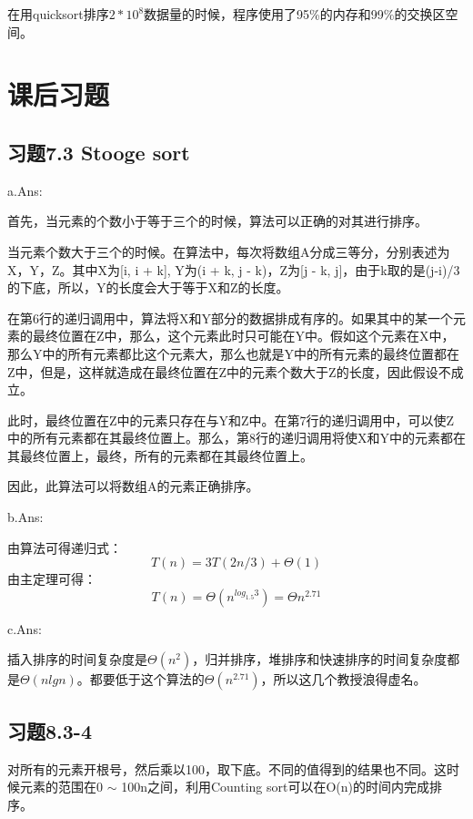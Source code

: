 \documentclass[a4paper, 11pt]{article}
\begin{document}
在用quicksort排序$2 * 10 ^ 8$数据量的时候，程序使用了95\%的内存和99\%的交换区空间。

\section{课后习题}
\subsection{习题7.3 Stooge sort}
a.Ans:

首先，当元素的个数小于等于三个的时候，算法可以正确的对其进行排序。

当元素个数大于三个的时候。在算法中，每次将数组A分成三等分，分别表述为X，Y，Z。其中X为[i, i + k], Y为(i + k, j - k)，Z为[j - k, j]，由于k取的是(j-i)/3的下底，所以，Y的长度会大于等于X和Z的长度。

在第6行的递归调用中，算法将X和Y部分的数据排成有序的。如果其中的某一个元素的最终位置在Z中，那么，这个元素此时只可能在Y中。假如这个元素在X中，那么Y中的所有元素都比这个元素大，那么也就是Y中的所有元素的最终位置都在Z中，但是，这样就造成在最终位置在Z中的元素个数大于Z的长度，因此假设不成立。

此时，最终位置在Z中的元素只存在与Y和Z中。在第7行的递归调用中，可以使Z中的所有元素都在其最终位置上。那么，第8行的递归调用将使X和Y中的元素都在其最终位置上，最终，所有的元素都在其最终位置上。

因此，此算法可以将数组A的元素正确排序。

b.Ans:

由算法可得递归式：
\begin{displaymath}
	T(n) = 3T(2n/3)+\Theta(1)
\end{displaymath}
由主定理可得：
\begin{displaymath}
	T(n) = \Theta(n ^ {log_{1.5}{3}}) = \Theta{n^{2.71}}
\end{displaymath}

c.Ans:

插入排序的时间复杂度是$\Theta(n^2)$，归并排序，堆排序和快速排序的时间复杂度都是$\Theta(nlgn)$。都要低于这个算法的$\Theta(n^{2.71})$，所以这几个教授浪得虚名。

\subsection{习题8.3-4}

对所有的元素开根号，然后乘以100，取下底。不同的值得到的结果也不同。这时候元素的范围在0 $\sim$ 100n之间，利用Counting sort可以在O(n)的时间内完成排序。
\end{document}
